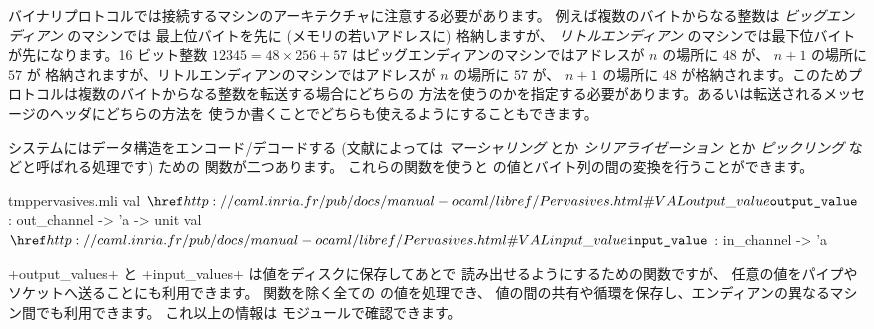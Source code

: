 バイナリプロトコルでは接続するマシンのアーキテクチャに注意する必要があります。
例えば複数のバイトからなる整数は \emph{ビッグエンディアン} のマシンでは
最上位バイトを先に (メモリの若いアドレスに) 格納しますが、 \emph{リトルエンディアン}
のマシンでは最下位バイトが先になります。16 ビット整数 $12345 = 48 \times 256 + 57$
はビッグエンディアンのマシンではアドレスが $n$ の場所に $48$ が、 $n+1$ の場所に $57$ が
格納されますが、リトルエンディアンのマシンではアドレスが $n$ の場所に $57$ が、 $n+1$ の場所に
$48$ が格納されます。このためプロトコルは複数のバイトからなる整数を転送する場合にどちらの
方法を使うのかを指定する必要があります。あるいは転送されるメッセージのヘッダにどちらの方法を
使うか書くことでどちらも使えるようにすることもできます。

\ocaml システムにはデータ構造をエンコード/デコードする (文献によっては
\emph{マーシャリング} とか \emph{シリアライゼーション} とか \emph{ピックリング} などと呼ばれる処理です) ための
関数が二つあります。
これらの関数を使うと \ocaml の値とバイト列の間の変換を行うことができます。
%
\begin{listingcodefile}{tmppervasives.mli}
val $\indexlibvalue{Pervasives}{output\_value}$ : out_channel -> 'a -> unit
val $\indexlibvalue{Pervasives}{input\_value}$ : in_channel -> 'a
\end{listingcodefile}
%
\ml+output_values+ と \ml+input_values+ は値をディスクに保存してあとで
読み出せるようにするための関数ですが、
任意の値をパイプやソケットへ送ることにも利用できます。
関数を除く全ての \ocaml の値を処理でき、
値の間の共有や循環を保存し、エンディアンの異なるマシン間でも利用できます。
これ以上の情報は  モジュールで確認できます。

